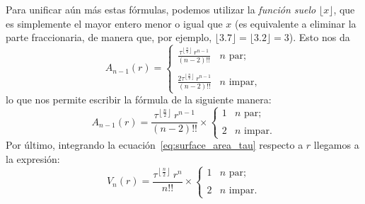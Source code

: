 Para unificar aún más estas fórmulas, podemos utilizar la \emph{función suelo} $\lfloor x \rfloor$, que es simplemente el mayor entero menor o igual que $x$ (es equivalente a eliminar la parte fraccionaria, de manera que, por ejemplo, $\lfloor 3.7 \rfloor = \lfloor 3.2 \rfloor = 3$). Esto nos da
\[ A_{n-1}(r) = \begin{cases}
 \displaystyle \frac{\tau^{\left\lfloor \frac{n}{2} \right\rfloor}\,r^{n-1}}{(n-2)!!} & n \text{ par}; \\ \\
 \displaystyle \frac{2\tau^{\left\lfloor \frac{n}{2} \right\rfloor}\,r^{n-1}}{(n-2)!!} & n \text{ impar},
 \end{cases} \]
lo que nos permite escribir la fórmula de la siguiente manera:
\begin{equation}
\label{eq:surface_area_tau}
A_{n-1}(r) = \frac{\tau^{\left\lfloor \frac{n}{2} \right\rfloor}\,r^{n-1}}{(n-2)!!}\times \begin{cases}
1 & n \text{ par}; \\ \\
2 & n \text{ impar}.
\end{cases}
\end{equation}
Por último, integrando la ecuación~\eqref{eq:surface_area_tau} respecto a $r$ llegamos a la expresión:
\begin{equation}
\label{eq:volume_tau}
V_n(r) = \frac{\tau^{\left\lfloor \frac{n}{2} \right\rfloor}\,r^n}{n!!}\times \begin{cases}
1 & n \text{ par}; \\ \\
2 & n \text{ impar}.
\end{cases}
\end{equation}

